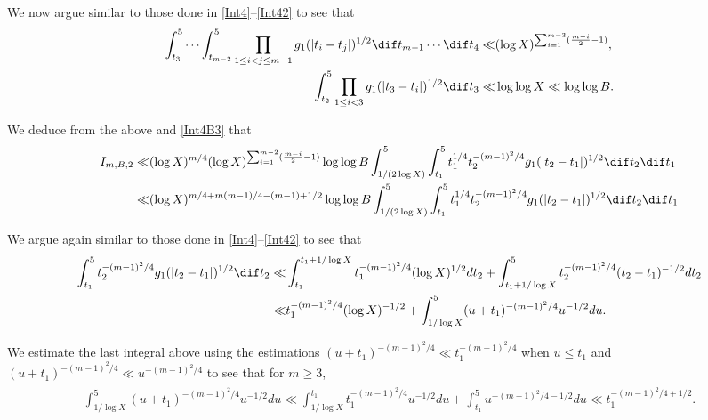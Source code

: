 \documentclass[twoside,leqno,10pt, A4]{amsart}
\begin{document}
   We now argue similar to those done in  \eqref{Int4}--\eqref{Int42} to see that
\begin{align*}
\begin{split}
   \int_{t_3}^{5}\cdots \int_{t_{m-2}}^{5}\prod_{1\leq i<j\leq m-1} g_1(|t_i-t_j|)^{1/2}\dif t_{m-1} \cdots \dif t_4  \ll &  (\log X)^{\sum^{m-3}_{i=1}(\frac {m-i}2-1)}, \\
   \int_{t_2}^{5}  \prod_{1\leq i< 3} g_1(|t_3-t_i|)^{1/2}\dif t_3 \ll & \log \log X \ll  \log \log B.
\end{split}
\end{align*}

   We deduce from the above and \eqref{Int4B3} that
\begin{align}
\label{Int4B2}
\begin{split}
  I_{m,B,2} \ll & (\log X)^{m/4}(\log X)^{\sum^{m-2}_{i=1}(\frac {m-i}2-1)}\log \log B\int_{1/(2\log X)}^{5}\int_{t_1}^{5}  t_1^{1/4}t_2^{-(m-1)^2/4} g_1(|t_2-t_1|)^{1/2}\dif t_2 \dif t_1 \\
  \ll &  (\log X)^{m/4+m(m-1)/4-(m-1)+1/2}\log \log B\int_{1/(2\log X)}^{5}\int_{t_1}^{5}  t_1^{1/4}t_2^{-(m-1)^2/4} g_1(|t_2-t_1|)^{1/2}\dif t_2 \dif t_1
\end{split}
\end{align}

   We argue again similar to those done in  \eqref{Int4}--\eqref{Int42} to see that
\begin{align}
\label{Int2est}
\begin{split}
 \int_{t_1}^{5} t_2^{-(m-1)^2/4} g_1(|t_2-t_1|)^{1/2}\dif t_2 \ll  &
  \int_{t_1}^{t_{1}+1/\log X}  t_1^{-(m-1)^2/4} (\log X)^{1/2}dt_2+\int_{t_{1}+1/\log X}^5  t_2^{-(m-1)^2/4} (t_2-t_1)^{-1/2}dt_2 \\
  \ll  &  t_1^{-(m-1)^2/4} (\log X)^{-1/2}+\int_{1/\log X}^{5}  (u+t_1)^{-(m-1)^2/4}u^{-1/2}du.
\end{split}
\end{align}

   We estimate the last integral above using the estimations $(u+t_1)^{-(m-1)^2/4} \ll t_1^{-(m-1)^2/4}$ when $u \leq t_1$ and $(u+t_1)^{-(m-1)^2/4} \ll u^{-(m-1)^2/4}$ to see that for $m \geq 3$,
\begin{align*}
\begin{split}
 \int_{1/\log X}^{5}  (u+t_1)^{-(m-1)^2/4}u^{-1/2}du \ll \int_{1/\log X}^{t_1}t_1^{-(m-1)^2/4}u^{-1/2}du+\int_{t_1}^{5}u^{-(m-1)^2/4-1/2}du \ll t_1^{-(m-1)^2/4+1/2} .
\end{split}
\end{align*}
\end{document}
